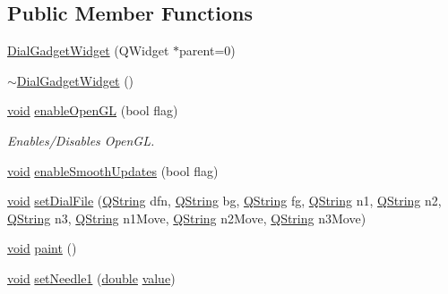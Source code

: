 \subsection*{Public Member Functions}
\begin{DoxyCompactItemize}
\item 
\hyperlink{group___dial_plugin_gac5397a4cc992266439aa3e8b1513c209}{Dial\-Gadget\-Widget} (Q\-Widget $\ast$parent=0)
\item 
\hyperlink{group___dial_plugin_ga3e34cc3b776a627597b4c4823b358741}{$\sim$\-Dial\-Gadget\-Widget} ()
\item 
\hyperlink{group___u_a_v_objects_plugin_ga444cf2ff3f0ecbe028adce838d373f5c}{void} \hyperlink{group___dial_plugin_gaad3e246709ada936d97644f6e87fba59}{enable\-Open\-G\-L} (bool flag)
\begin{DoxyCompactList}\small\item\em Enables/\-Disables Open\-G\-L. \end{DoxyCompactList}\item 
\hyperlink{group___u_a_v_objects_plugin_ga444cf2ff3f0ecbe028adce838d373f5c}{void} \hyperlink{group___dial_plugin_ga6b6e527e9c2516f6dec2f6332a288a9f}{enable\-Smooth\-Updates} (bool flag)
\item 
\hyperlink{group___u_a_v_objects_plugin_ga444cf2ff3f0ecbe028adce838d373f5c}{void} \hyperlink{group___dial_plugin_ga00bc4e8b1988a13cf8d1fff889444684}{set\-Dial\-File} (\hyperlink{group___u_a_v_objects_plugin_gab9d252f49c333c94a72f97ce3105a32d}{Q\-String} dfn, \hyperlink{group___u_a_v_objects_plugin_gab9d252f49c333c94a72f97ce3105a32d}{Q\-String} bg, \hyperlink{group___u_a_v_objects_plugin_gab9d252f49c333c94a72f97ce3105a32d}{Q\-String} fg, \hyperlink{group___u_a_v_objects_plugin_gab9d252f49c333c94a72f97ce3105a32d}{Q\-String} n1, \hyperlink{group___u_a_v_objects_plugin_gab9d252f49c333c94a72f97ce3105a32d}{Q\-String} n2, \hyperlink{group___u_a_v_objects_plugin_gab9d252f49c333c94a72f97ce3105a32d}{Q\-String} n3, \hyperlink{group___u_a_v_objects_plugin_gab9d252f49c333c94a72f97ce3105a32d}{Q\-String} n1\-Move, \hyperlink{group___u_a_v_objects_plugin_gab9d252f49c333c94a72f97ce3105a32d}{Q\-String} n2\-Move, \hyperlink{group___u_a_v_objects_plugin_gab9d252f49c333c94a72f97ce3105a32d}{Q\-String} n3\-Move)
\item 
\hyperlink{group___u_a_v_objects_plugin_ga444cf2ff3f0ecbe028adce838d373f5c}{void} \hyperlink{group___dial_plugin_gab6b769564974c0549228d13820ced8e7}{paint} ()
\item 
\hyperlink{group___u_a_v_objects_plugin_ga444cf2ff3f0ecbe028adce838d373f5c}{void} \hyperlink{group___dial_plugin_gaab89c42817209c3b41a9f407138b2c2f}{set\-Needle1} (\hyperlink{_super_l_u_support_8h_a8956b2b9f49bf918deed98379d159ca7}{double} \hyperlink{glext_8h_aa0e2e9cea7f208d28acda0480144beb0}{value})

\end{DoxyCompactItemize}
